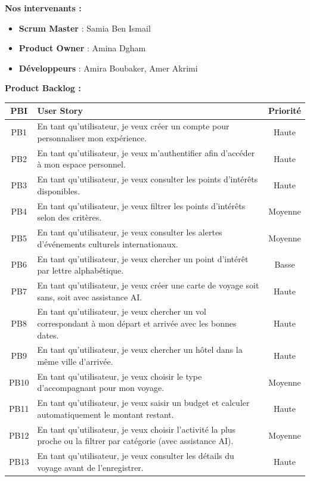 \textbf{Nos intervenants :}
\begin{itemize}
    \item \textbf{Scrum Master} : Samia Ben Ismail
    \item \textbf{Product Owner} : Amina Dgham
    \item \textbf{Développeurs} : Amira Boubaker, Amer  Akrimi
\end{itemize}

\textbf{Product Backlog :}
\begin{table}[H]
    \centering
    \begin{tabularx}{\textwidth}{|c|X|c|}
        \hline
        \textbf{PBI} & \textbf{User Story} & \textbf{Priorité} \\
        \hline
        PB1 & En tant qu’utilisateur, je veux créer un compte pour personnaliser mon expérience. & Haute \\
        \hline
        PB2 & En tant qu’utilisateur, je veux m’authentifier afin d’accéder à mon espace personnel. & Haute \\
        \hline
        PB3 & En tant qu’utilisateur, je veux consulter les points d’intérêts disponibles. & Haute \\
        \hline
        PB4 & En tant qu’utilisateur, je veux filtrer les points d’intérêts selon des critères. & Moyenne \\
        \hline
        PB5 & En tant qu’utilisateur, je veux consulter les alertes d’événements culturels internationaux. & Moyenne \\
        \hline
        PB6 & En tant qu’utilisateur, je veux chercher un point d’intérêt par lettre alphabétique. & Basse \\
        \hline
        PB7 & En tant qu’utilisateur, je veux créer une carte de voyage soit sans, soit avec assistance AI. & Haute \\
        \hline
        PB8 & En tant qu’utilisateur, je veux chercher un vol correspondant à mon départ et arrivée avec les bonnes dates. & Haute \\
        \hline
        PB9 & En tant qu’utilisateur, je veux chercher un hôtel dans la même ville d’arrivée. & Haute \\
        \hline
        PB10 & En tant qu’utilisateur, je veux choisir le type d’accompagnant pour mon voyage. & Moyenne \\
        \hline
        PB11 & En tant qu’utilisateur, je veux saisir un budget et calculer automatiquement le montant restant. & Haute \\
        \hline
        PB12 & En tant qu’utilisateur, je veux choisir l’activité la plus proche ou la filtrer par catégorie (avec assistance AI). & Moyenne \\
        \hline
        PB13 & En tant qu’utilisateur, je veux consulter les détails du voyage avant de l’enregistrer. & Haute \\
        \hline
    \end{tabularx}
\end{table}

